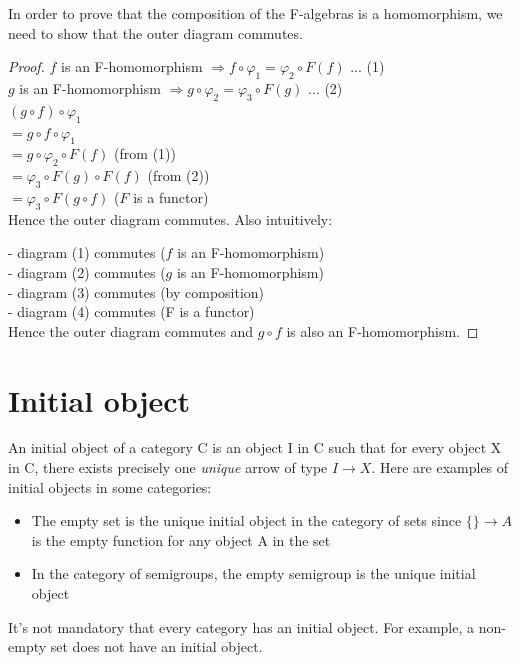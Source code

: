 \documentclass{article}
\begin{document}
\begin{itemize}
{In order to prove that the composition of the F-algebras is a homomorphism, we need to show that the outer diagram commutes.

\begin{proof}
$f$ is an F-homomorphism $\Rightarrow f \circ \varphi_{1} = \varphi_{2} \circ F(f)$  ... (1) \\
$g$ is an F-homomorphism $\Rightarrow g \circ \varphi_{2} = \varphi_{3} \circ F(g)$  ... (2) \\

$(g \circ f) \circ \varphi_{1}$ \\
$= g \circ f \circ \varphi_{1}$ \\
$= g \circ \varphi_{2} \circ F(f)$     (from (1)) \\
$= \varphi_{3} \circ F(g) \circ F(f)$  (from (2)) \\
$= \varphi_{3} \circ F(g \circ f)$   ($F$ is a functor) \\

Hence the outer diagram commutes. Also intuitively:

- diagram (1) commutes    ($f$ is an F-homomorphism) \\
- diagram (2) commutes    ($g$ is an F-homomorphism) \\
- diagram (3) commutes    (by composition) \\
- diagram (4) commutes    (F is a functor)  \\

Hence the outer diagram commutes and $g \circ f$ is also an F-homomorphism.
\end{proof}
}


\end{itemize}

\section{Initial object}

An initial object of a category C is an object I in C such that for every object X in C, there exists precisely one \textit{unique} arrow of type $I \rightarrow X$. Here are examples of initial objects in some categories:

\begin{itemize}
\item{The empty set is the unique initial object in the category of sets since $\{\} \rightarrow A$ is the empty function for any object A in the set}
\item{In the category of semigroups, the empty semigroup is the unique initial object}
\end{itemize}
It's not mandatory that every category has an initial object. For example, a non-empty set does not have an initial object.
\end{document}
